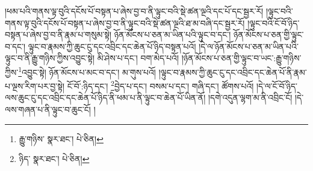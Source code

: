 །ཕམ་པའི་གནས་ལྟ་བུའི་དངོས་པོ་བསྟན་པ་ཞེས་བྱ་བ་ནི་ལྟུང་བའི་སྡེ་ཚན་ལྔའི་དང་པོ་དང་སྦྱར་རོ། །ལྟུང་བའི་གནས་ལྟ་བུའི་དངོས་པོ་བསྟན་པ་ཞེས་བྱ་བ་ནི་ལྟུང་བའི་སྡེ་ཚན་ལྔའི་ཐ་མ་བཞི་དང་སྦྱར་རོ། །ལྟུང་བའི་ངོ་བོ་ཉིད་བསྟན་པ་ཞེས་བྱ་བ་ནི་རྣམ་པ་གསུམ་སྟེ། ཉོན་མོངས་པ་ཅན་མ་ཡིན་པའི་ལྟུང་བ་དང་། ཉོན་མོངས་པ་ཅན་གྱི་ལྟུང་བ་དང་། ལྟུང་བ་རྣམས་ཀྱི་ཆུང་ངུ་དང་འབྲིང་དང་ཆེན་པོ་ཉིད་བསྟན་པའོ། །དེ་ལ་ཉོན་མོངས་པ་ཅན་མ་ཡིན་པའི་ལྟུང་བ་ནི་རྒྱུ་གཉིས་ཀྱིས་འབྱུང་སྟེ། མི་ཤེས་པ་དང་། བག་མེད་པའོ། །ཉོན་མོངས་པ་ཅན་གྱི་ལྟུང་བ་ཡང་:རྒྱུ་གཉིས་ཀྱིས་\footnote{རྒྱུ་གཉིས་  སྣར་ཐང་།  པེ་ཅིན། }འབྱུང་སྟེ། ཉོན་མོངས་པ་མང་བ་དང་། མ་གུས་པའོ། །ལྟུང་བ་རྣམས་ཀྱི་ཆུང་ངུ་དང་འབྲིང་དང་ཆེན་པོ་ནི་རྣམ་པ་ལྔས་རིག་པར་བྱ་སྟེ། ངོ་བོ་:ཉིད་དང་། \footnote{ཉིད་  སྣར་ཐང་།  པེ་ཅིན། }བྱེད་པ་དང་། བསམ་པ་དང་། གཞི་དང་། ཚོགས་པའོ། །དེ་ལ་ངོ་བོ་ཉིད་ལས་ཆུང་ངུ་དང་འབྲིང་དང་ཆེན་པོ་ཉིད་ནི་ཕམ་པ་ནི་ལྟུང་བ་ཆེན་པོ་ཡིན་ནོ། །དགེ་འདུན་ལྷག་མ་ནི་འབྲིང་ངོ། །དེ་ལས་གཞན་པ་ནི་ལྟུང་བ་ཆུང་ངོ། །
